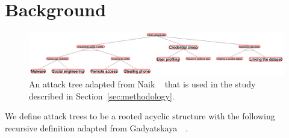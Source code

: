 \section{Background}
\label{sec:background}

\begin{figure}
    \includegraphics[width=\linewidth]{img/TargetAT.png}
    \caption{An attack tree adapted from Naik \etal~\cite{naikEvaluationPotentialAttack2022} that is used in the study described in Section~\ref{sec:methodology}. }
    \label{fig:tartgetAT}
\end{figure}

We define attack trees to be a rooted acyclic structure with the following recursive definition adapted from Gadyatskaya~\etal~\cite{gadyatskayaRefinementAwareGenerationAttack2017}.

